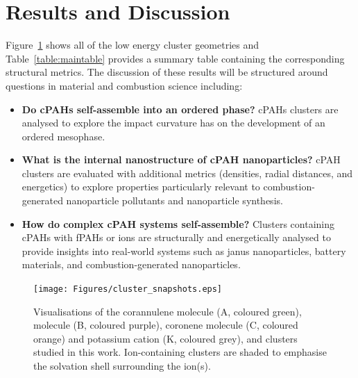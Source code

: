 \section{Results and Discussion}
%
Figure~\ref{fig:clustersnapshots} shows all of the low energy cluster geometries and Table~\ref{table:maintable} provides a summary table containing the corresponding structural metrics. The discussion of these results will be structured around questions in material and combustion science including:
\begin{itemize}
\item \textbf{Do cPAHs self-assemble into an ordered phase?} cPAHs clusters are analysed to explore the impact curvature has on the development of an ordered mesophase. 
\item \textbf{What is the internal nanostructure of cPAH nanoparticles?} cPAH clusters are evaluated with additional metrics (densities, radial distances, and energetics) to explore properties particularly relevant to combustion-generated nanoparticle pollutants and nanoparticle synthesis.
\item \textbf{How do complex cPAH systems self-assemble?} Clusters containing cPAHs with fPAHs or ions are structurally and energetically analysed to provide insights into real-world systems such as janus nanoparticles, battery materials, and combustion-generated nanoparticles.
\end{itemize}
%
\begin{figure}[!tbph]
\centering
\texttt{[image: Figures/cluster\_snapshots.eps]}
\caption{Visualisations of the corannulene molecule (A, coloured green),  molecule (B, coloured purple), coronene molecule (C, coloured orange) and potassium cation (K, coloured grey), and clusters studied in this work. Ion-containing clusters are shaded to emphasise the solvation shell surrounding the ion(s).}
\label{fig:clustersnapshots}
\end{figure}
%
